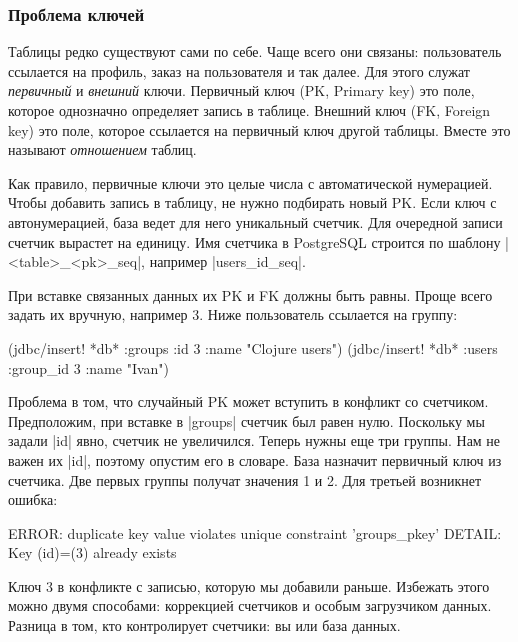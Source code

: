 \subsubsection*{Проблема ключей}

Таблицы редко существуют сами по себе. Чаще всего они связаны: пользователь
ссылается на профиль, заказ на пользователя и так далее. Для этого служат
\emph{первичный} и \emph{внешний} ключи. Первичный ключ (PK, Primary key) это
поле, которое однозначно определяет запись в таблице. Внешний ключ (FK, Foreign
key) это поле, которое ссылается на первичный ключ другой таблицы. Вместе это
называют \emph{отношением} таблиц.

Как правило, первичные ключи это целые числа с автоматической нумерацией. Чтобы
добавить запись в таблицу, не нужно подбирать новый PK. Если ключ с
автонумерацией, база ведет для него уникальный счетчик. Для очередной записи
счетчик вырастет на единицу. Имя счетчика в PostgreSQL строится по шаблону
\spverb|<table>_<pk>_seq|, например \spverb|users_id_seq|.

При вставке связанных данных их PK и FK должны быть равны. Проще всего задать их
вручную, например 3. Ниже пользователь ссылается на группу:

\begin{english}
  \begin{clojure}
(jdbc/insert! *db* :groups {:id 3 :name "Clojure users"})
(jdbc/insert! *db* :users {:group_id 3 :name "Ivan"})
  \end{clojure}
\end{english}

Проблема в том, что случайный PK может вступить в конфликт со
счетчиком. Предположим, при вставке в \spverb|groups| счетчик был равен
нулю. Поскольку мы задали \spverb|id| явно, счетчик не увеличился. Теперь нужны
еще три группы. Нам не важен их \spverb|id|, поэтому опустим его в словаре. База
назначит первичный ключ из счетчика. Две первых группы получат значения 1 и
2. Для третьей возникнет ошибка:

\begin{english}
  \begin{text}
ERROR:  duplicate key value violates unique constraint 'groups_pkey'
DETAIL:  Key (id)=(3) already exists
  \end{text}
\end{english}

Ключ 3 в конфликте с записью, которую мы добавили раньше. Избежать этого можно
двумя способами: коррекцией счетчиков и особым загрузчиком данных. Разница в
том, кто контролирует счетчики: вы или база данных.

